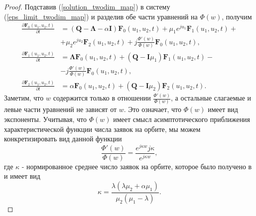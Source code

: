 \begin{proof}
	Подставив (\ref{solution_twodim_map}) в систему (\ref{eps_limit_twodim_map}) и разделив обе части уравнений на $\Phi(w)$, получим
	\begin{equation} \label{preresult_twodim_map}
	\begin{split}
		\frac{{\partial \boldsymbol{F}_{0}(u_{1},u_{2},t)}}{{\partial t}} &= (\boldsymbol{Q}-\boldsymbol{\Lambda}-\alpha\boldsymbol{I})\boldsymbol{F}_{0}(u_{1},u_{2},t) + \mu_{1} e^{ju_{1}}\boldsymbol{F}_{1}(u_{1},u_{2},t)  + \\  &+ \mu_{2}e^{ju_{2}}\boldsymbol{F}_{2}(u_{1},u_{2},t) + j\frac{\Phi'(w) }{\Phi(w)}
		 \boldsymbol{F}_{0}(u_{1},u_{2},t),
		\\
		\frac{{\partial \boldsymbol{F}_{1}(u_{1},u_{2},t)}}{{\partial t}} &= \boldsymbol{\Lambda} \boldsymbol{F}_{0}(u_{1},u_{2},t) +  (\boldsymbol{Q} - \boldsymbol{I}\mu_{1})\boldsymbol{F}_{1}(u_{1},u_{2},t) -\\ &- j\frac{\Phi'(w) }{\Phi(w)}
		 \boldsymbol{F}_{0}(u_{1},u_{2},t),
		\\
		\frac{{\partial \boldsymbol{F}_{2}(u_{1},u_{2},t)}}{{\partial t}} &= \alpha \boldsymbol{F}_{0}(u_{1},u_{2},t) + (\boldsymbol{Q} - \boldsymbol{I}\mu_{2})\boldsymbol{F}_{2}(u_{1},u_{2},t).
	\end{split}
	\end{equation}  
	Заметим, что $w$ содержится только в отношении $\frac{\Phi'(w) }{\Phi(w)}$, а остальные слагаемые и левые части уравнений не зависят от $w$. Это означает, что  $\Phi(w)$ имеет вид экспоненты. Учитывая, что  $\Phi(w)$ имеет смысл асимптотического приближения характеристической функции числа заявок на орбите, мы можем конкретизировать вид данной функции
	\begin{equation*}
		\frac{\Phi'(w) }{\Phi(w)} = \frac{e^{j\kappa w}j\kappa}{e^{j\kappa w}},
	\end{equation*} 
	где $\kappa$ - нормированное среднее число заявок на орбите, которое было получено в \cite{nazarov2017asymptotic} и имеет вид 
	\begin{equation*}
		\kappa = \frac{\lambda(\lambda \mu_{2} + \alpha \mu_{1})}{\mu_{2}(\mu_{1} - \lambda)}.
	\end{equation*}
	

\end{proof}
